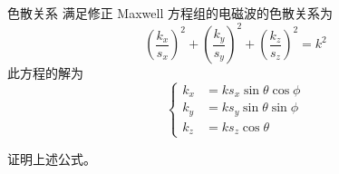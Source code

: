 \begin{theorem}{色散关系}
    满足修正 Maxwell 方程组的电磁波的色散关系为
    \begin{equation}
        \left(
            \frac{k_x}{s_x}
        \right)^2
        +\left(
            \frac{k_y}{s_y}
        \right)^2
        +\left(
            \frac{k_z}{s_z}
        \right)^2=k^2
    \end{equation}
    此方程的解为
    \begin{equation}
        \left\{
            \begin{aligned}
                k_x&=k s_x\sin \theta \cos \phi\\
                k_y&=k s_y\sin \theta \sin \phi\\
                k_z&=k s_z\cos \theta
            \end{aligned}
        \right.
    \end{equation}
\end{theorem}

\begin{exercise}
    证明上述公式。
\end{exercise}

